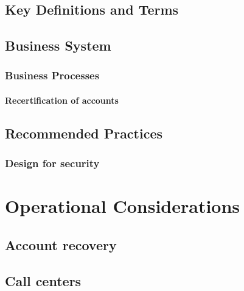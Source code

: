 \hypertarget{key-definitions-and-terms}{%
\section{Key Definitions and Terms
}\label{key-definitions-and-terms}}

\hypertarget{business-system}{%
\section{Business System}\label{business-system}}

\hypertarget{business-processes}{%
\subsection{Business Processes}\label{business-processes}}

\hypertarget{recertification-of-accounts}{%
\subsubsection{Recertification of
accounts}\label{recertification-of-accounts}}

\hypertarget{recommended-practices}{%
\section{Recommended Practices}\label{recommended-practices}}

\hypertarget{design-for-security}{%
\subsection{Design for security}\label{design-for-security}}

\hypertarget{operational-considerations}{%
\chapter{Operational Considerations}\label{operational-considerations}}

\hypertarget{account-recovery}{%
\section{Account recovery}\label{account-recovery}}

\hypertarget{call-centers}{%
\section{Call centers}\label{call-centers}}

